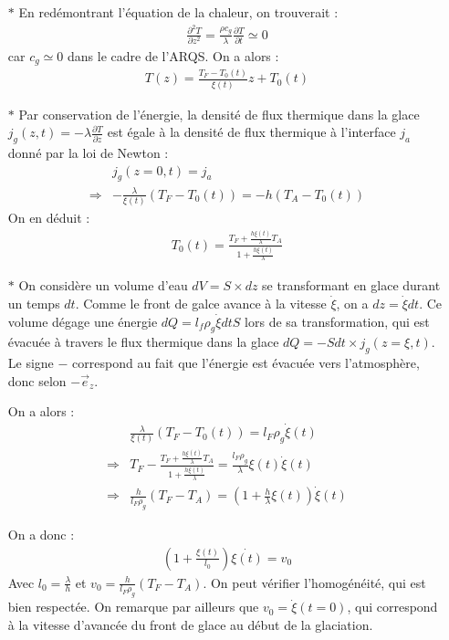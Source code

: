\documentclass{report}
\begin{document}
\begin{itemize}

	\item[$\ast$] En redémontrant l'équation de la chaleur, on trouverait :
	\begin{align*}
		\frac{\partial^2 T}{\partial z^2} = \frac{\rho c_g}{\lambda}\frac{\partial T}{\partial t} \simeq0
	\end{align*}
	car $c_g\simeq0$ dans le cadre de l'ARQS. On a alors :
	\begin{align*}
		T(z) = \frac{T_F-T_0(t)}{\xi(t)}z+T_0(t)
	\end{align*}
	
	\item[$\ast$] Par conservation de l'énergie, la densité de flux thermique dans la glace $j_g(z,t)=-\lambda\frac{\partial T}{\partial z}$ est égale à la densité de flux thermique à l'interface $j_a$ donné par la loi de Newton :
	\begin{align*}
		& j_g(z=0,t)=j_a \\
		\Rightarrow & -\frac{\lambda}{\xi(t)}(T_F-T_0(t))=-h(T_A-T_0(t))
	\end{align*}
	On en déduit :
	\begin{align*}
		T_0(t)=\frac{T_F+\frac{h\xi(t)}{\lambda}T_A}{1+\frac{h\xi(t)}{\lambda}}
	\end{align*}
	
	\item[$\ast$] On considère un volume d'eau $dV=S\times dz$ se transformant en glace durant un temps $dt$. Comme le front de galce avance à la vitesse $\dot{\xi}$, on a $dz=\dot{\xi}dt$. Ce volume dégage une énergie $dQ=l_f\rho_g\dot{\xi}dtS$ lors de sa transformation, qui est évacuée à travers le flux thermique dans la glace $dQ = -Sdt\times j_g(z=\xi,t)$. Le signe $-$ correspond au fait que l'énergie est évacuée vers l'atmosphère, donc selon $-\vec{e}_z$.
	
	On a alors : 
	\begin{align*}
		&\frac{\lambda}{\xi(t)}(T_F-T_0(t))=l_F\rho_g\dot{\xi}(t) \\
		\Rightarrow & T_F-\frac{T_F+\frac{h\xi(t)}{\lambda}T_A}{1+\frac{h\xi(t)}{\lambda}} =\frac{l_F\rho_g}{\lambda} \xi(t)\dot{\xi}(t) \\
		\Rightarrow & \frac{h}{l_F\rho_g}(T_F-T_A)=\left(1+\frac{h}{\lambda}\xi(t) \right) \dot{\xi}(t)
	\end{align*}
	
	On a donc :
	\begin{align*}
		\left( 1+\frac{\xi(t)}{l_0}\right) \dot{\xi(t)}=v_0
	\end{align*}
	Avec $l_0=\frac{\lambda}{h}$ et $v_0=\frac{h}{l_F\rho_g}(T_F-T_A)$. On peut vérifier l'homogénéité, qui est bien respectée. On remarque par ailleurs que $v_0=\dot{\xi}(t=0)$, qui correspond à la vitesse d'avancée du front de glace au début de la glaciation.
	

\end{itemize}
\end{document}
